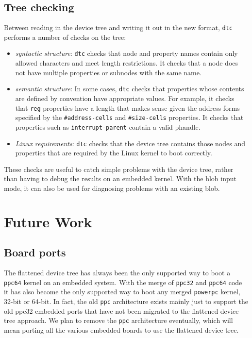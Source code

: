 \documentclass[a4paper,twocolumn]{article}
\newcommand{\dtc}{\texttt{dtc}\xspace}
\begin{document}
\subsection{Tree checking}

Between reading in the device tree and writing it out in the new
format, \dtc performs a number of checks on the tree:
\begin{itemize}
\item \emph{syntactic structure}:  \dtc checks that node and property
  names contain only allowed characters and meet length restrictions.
  It checks that a node does not have multiple properties or subnodes
  with the same name.
\item \emph{semantic structure}: In some cases, \dtc checks that
  properties whose contents are defined by convention have appropriate
  values.  For example, it checks that \texttt{reg} properties have a
  length that makes sense given the address forms specified by the
  \texttt{\#address-cells} and \texttt{\#size-cells} properties.  It
  checks that properties such as \texttt{interrupt-parent} contain a
  valid phandle.
\item \emph{Linux requirements}:  \dtc checks that the device tree
  contains those nodes and properties that are required by the Linux
  kernel to boot correctly.
\end{itemize}

These checks are useful to catch simple problems with the device tree,
rather than having to debug the results on an embedded kernel.  With
the blob input mode, it can also be used for diagnosing problems with
an existing blob.

\section{Future Work}

\subsection{Board ports}

The flattened device tree has always been the only supported way to
boot a \texttt{ppc64} kernel on an embedded system.  With the merge of
\texttt{ppc32} and \texttt{ppc64} code it has also become the only
supported way to boot any merged \texttt{powerpc} kernel, 32-bit or
64-bit.  In fact, the old \texttt{ppc} architecture exists mainly just
to support the old ppc32 embedded ports that have not been migrated
to the flattened device tree approach.  We plan to remove the
\texttt{ppc} architecture eventually, which will mean porting all the
various embedded boards to use the flattened device tree.
\end{document}
